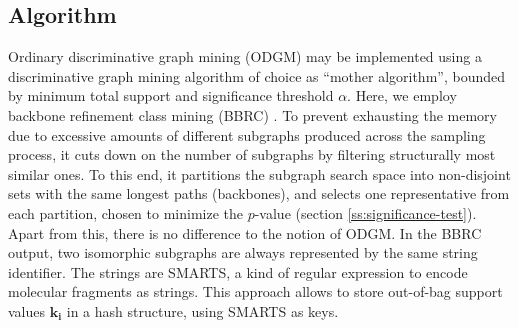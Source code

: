 \documentclass{sig-alternate}
\begin{document}
\subsection{Algorithm}
\label{s:Algorithm}
Ordinary discriminative graph mining (ODGM) may be 
implemented using a discriminative graph mining algorithm of choice as ``mother algorithm'', bounded 
by minimum total support and significance threshold $\alpha$. Here, we employ backbone refinement 
class mining (BBRC) \cite{maunz11efficient}. 
To prevent exhausting the memory due to excessive amounts of different subgraphs produced
across the sampling process, it cuts down on the number of subgraphs by filtering structurally 
most similar ones. 
To this end, it partitions the subgraph search space into non-disjoint sets with the same 
longest paths (backbones), and selects one representative from each partition, chosen to 
minimize the $p$-value (section \ref{ss:significance-test}). 
Apart from this, there is no difference to the notion of ODGM.
In the BBRC output, two isomorphic subgraphs are always represented by the same string identifier.
The strings are SMARTS, a kind of regular expression to encode molecular fragments as strings\footnotemark{}. 
This approach allows to store out-of-bag support values $\mathbf{k_i}$ in a
hash structure, using SMARTS as keys. 
\end{document}
